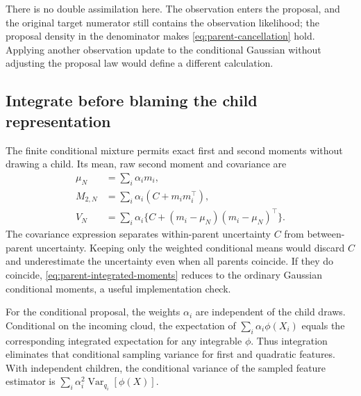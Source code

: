 There is no double assimilation here. The observation enters the proposal,
and the original target numerator still contains the observation likelihood;
the proposal density in the denominator makes
\eqref{eq:parent-cancellation} hold. Applying another observation update to the
conditional Gaussian without adjusting the proposal law would define a
different calculation.

\subsection{Integrate before blaming the child representation}

The finite conditional mixture permits exact first and second moments without
drawing a child. Its mean, raw second moment and covariance are
\begin{align}
 \mu_N&=\sum_i\alpha_i m_i,\\
 M_{2,N}&=\sum_i\alpha_i(C+m_im_i^\top),\\
 V_N&=\sum_i\alpha_i\{C+(m_i-\mu_N)(m_i-\mu_N)^\top\}.
 \label{eq:parent-integrated-moments}
\end{align}
The covariance expression separates within-parent uncertainty $C$ from
between-parent uncertainty. Keeping only the weighted conditional means would
discard $C$ and underestimate the uncertainty even when all parents coincide.
If they do coincide, \eqref{eq:parent-integrated-moments} reduces to the
ordinary Gaussian conditional moments, a useful implementation check.

For the conditional proposal, the weights $\alpha_i$ are independent of the
child draws. Conditional on the incoming cloud, the expectation of
$\sum_i\alpha_i\phi(X_i)$ equals the corresponding integrated expectation
for any integrable $\phi$. Thus integration eliminates that conditional
sampling variance for first and quadratic features. With independent children,
the conditional variance of the sampled feature estimator is
$\sum_i\alpha_i^2\operatorname{Var}_{q_i}[\phi(X)]$.

